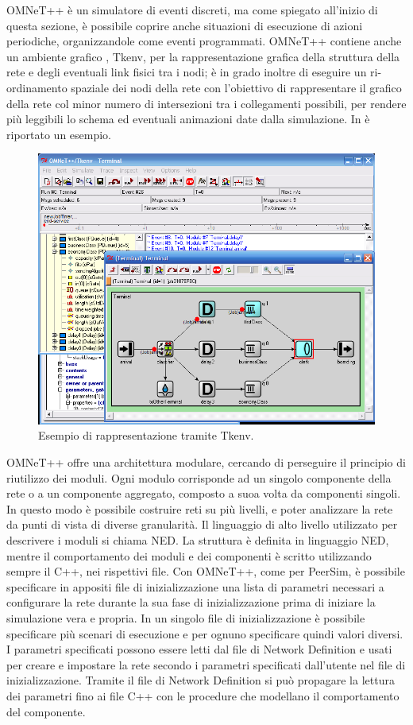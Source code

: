 OMNeT++ è un simulatore di eventi discreti, ma come spiegato all'inizio di questa sezione, è possibile coprire anche situazioni di esecuzione di azioni periodiche, organizzandole come eventi programmati. OMNeT++ contiene anche un ambiente grafico \cite{omnet2002-overview}, Tkenv, per la rappresentazione grafica della struttura della rete e degli eventuali link fisici tra i nodi; è in grado inoltre di eseguire un ri-ordinamento spaziale dei nodi della rete con l'obiettivo di rappresentare il grafico della rete col minor numero di intersezioni tra i collegamenti possibili, per rendere più leggibili lo schema ed eventuali animazioni date dalla simulazione. In  è riportato un esempio.
\begin{figure}[tb]
\centering
\includegraphics[width=0.7\linewidth]{Images/omnet/tkenv_01}
\caption[tkenv]{Esempio di rappresentazione tramite Tkenv.}
\label{fig:tkenv_01}
\end{figure}
OMNeT++ offre una architettura modulare, cercando di perseguire il principio di riutilizzo dei moduli\cite{omnet2002-overview}. Ogni modulo corrisponde ad un singolo componente della rete o a un componente aggregato, composto a suoa volta da componenti singoli. In questo modo è possibile costruire reti su più livelli, e poter analizzare la rete da punti di vista di diverse granularità. Il linguaggio di alto livello utilizzato per descrivere i moduli si chiama \acf{NED}. La struttura è definita in linguaggio \acs{NED}, mentre il comportamento dei moduli e dei componenti è scritto utilizzando sempre il C++, nei rispettivi file. 
Con OMNeT++, come per PeerSim,  è possibile specificare in appositi file di inizializzazione una lista di parametri necessari a configurare la rete durante la sua fase di inizializzazione prima di iniziare la simulazione vera e propria.  In un singolo file di inizializzazione è possibile specificare più scenari di esecuzione e per ognuno specificare quindi valori diversi. I parametri specificati possono essere letti dal file di Network Definition e usati per creare e impostare la rete secondo i parametri specificati dall'utente nel file di inizializzazione. Tramite il file di Network Definition si può propagare la lettura dei parametri fino ai file C++ con le procedure che modellano il comportamento del componente.
